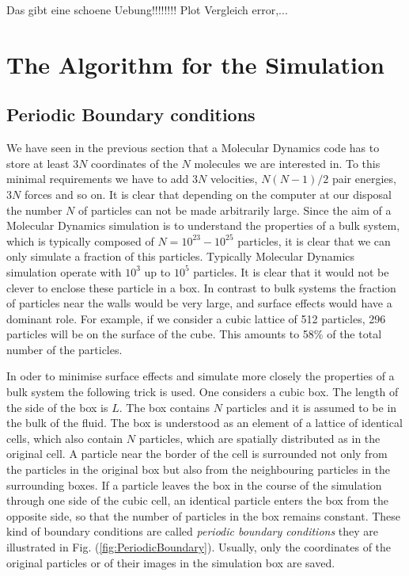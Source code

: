Das gibt eine schoene Uebung!!!!!!!!
Plot Vergleich error,...


\section{The Algorithm for the Simulation}
\subsection{Periodic Boundary conditions}
We have seen in the previous section that a Molecular Dynamics code has to 
store at
least $3N$ coordinates of the $N$ molecules we are interested in. To this
minimal requirements we have to add $3N$ velocities, $N(N-1)/2$ pair energies,
$3N$ forces and so on. It is clear that depending on the computer at our
disposal the number $N$ of particles can not be made arbitrarily large. Since
the aim of a Molecular Dynamics simulation is to 
understand the properties of a bulk system, which is typically
composed of $N=10^{23} - 10^{25}$ particles, it is clear that we can
only simulate a fraction of this particles. Typically Molecular Dynamics
simulation operate with $10^3$ up to $10^5$ particles. It is clear that it
would not be clever to enclose these particle in a box. In contrast to bulk
systems the fraction of particles near the walls would be very large, and 
surface effects would have a dominant role. For example, if we consider
a cubic lattice of 512 particles, 296 particles will be on the surface of the
cube. This amounts to 58\% of the total number of the particles.

In oder to minimise surface effects and simulate more closely the properties
of a bulk system the following trick is used. One considers a cubic box. The
length of the side of the box is $L$. The box contains $N$ particles and it is
assumed to be in the bulk of the fluid. The box is understood as an
element of a lattice of identical cells, which also contain $N$ particles,
which are spatially distributed as in the original cell. A particle near the
border of the cell is surrounded not only from the particles in the original
box but also from the neighbouring particles in the surrounding boxes. If a
particle leaves the box in the course of the simulation through one side of the
cubic cell, an identical particle enters the box from the opposite side, so
that the number of particles in the box remains constant. These kind of
boundary conditions are called \textit{periodic boundary conditions}
 they are illustrated in Fig. 
(\ref{fig:PeriodicBoundary}). Usually, only the coordinates of the original
particles or of their images in the simulation box are saved.

